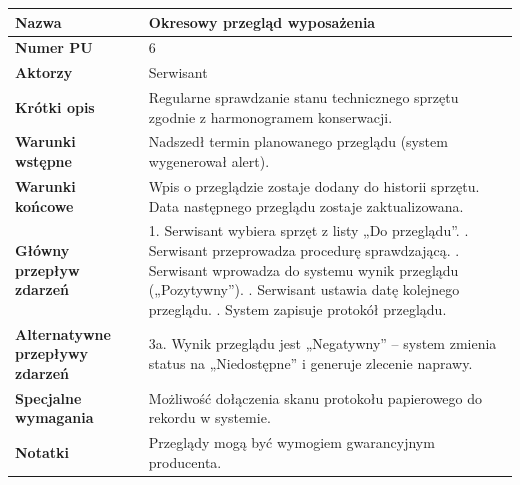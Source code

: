 \documentclass{article}
\begin{document}
    \begin{tabular}{|m{10em}|m{20em}|}
        \hline
        \textbf{Nazwa} & Okresowy przegląd wyposażenia \\
        \hline
        \textbf{Numer PU} & 6 \\
        \hline
        \textbf{Aktorzy} & Serwisant \\
        \hline
        \textbf{Krótki opis} & Regularne sprawdzanie stanu technicznego sprzętu zgodnie z harmonogramem konserwacji. \\
        \hline
        \textbf{Warunki wstępne} & Nadszedł termin planowanego przeglądu (system wygenerował alert). \\
        \hline
        \textbf{Warunki końcowe} & Wpis o przeglądzie zostaje dodany do historii sprzętu. Data następnego przeglądu zostaje zaktualizowana. \\
        \hline
        \textbf{Główny przepływ zdarzeń} & 
            1. Serwisant wybiera sprzęt z listy „Do przeglądu”. \newline
            2. Serwisant przeprowadza procedurę sprawdzającą. \newline
            3. Serwisant wprowadza do systemu wynik przeglądu („Pozytywny”). \newline
            4. Serwisant ustawia datę kolejnego przeglądu. \newline
            5. System zapisuje protokół przeglądu. \\
        \hline
        \textbf{Alternatywne przepływy zdarzeń} & 
            3a. Wynik przeglądu jest „Negatywny” – system zmienia status na „Niedostępne” i generuje zlecenie naprawy. \\
        \hline
        \textbf{Specjalne wymagania} & Możliwość dołączenia skanu protokołu papierowego do rekordu w systemie. \\
        \hline
        \textbf{Notatki} & Przeglądy mogą być wymogiem gwarancyjnym producenta. \\
        \hline
    \end{tabular}

    \vspace{1cm}
\end{document}
